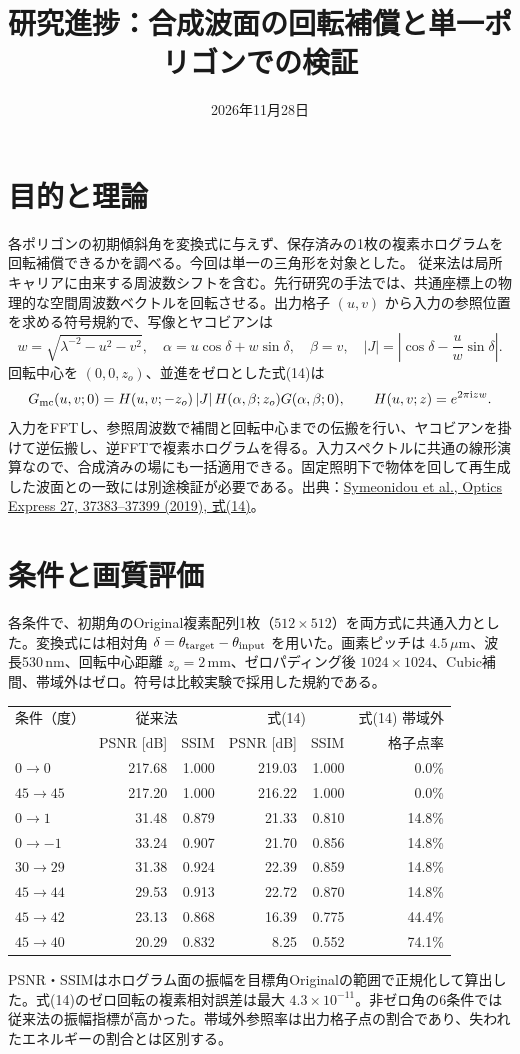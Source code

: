 \documentclass[a4paper,10pt]{ltjsarticle}
\title{研究進捗：合成波面の回転補償と単一ポリゴンでの検証}
\author{}
\date{2026年11月28日}
\begin{document}
\maketitle
\section{目的と理論}
各ポリゴンの初期傾斜角を変換式に与えず、保存済みの1枚の複素ホログラムを回転補償できるかを調べる。今回は単一の三角形を対象とした。
従来法は局所キャリアに由来する周波数シフトを含む。先行研究の手法では、共通座標上の物理的な空間周波数ベクトルを回転させる。出力格子 $(u,v)$ から入力の参照位置を求める符号規約で、写像とヤコビアンは
\[
 w=\sqrt{\lambda^{-2}-u^2-v^2},\quad
 \alpha=u\cos\delta+w\sin\delta,\quad \beta=v,\quad
 |J|=\left|\cos\delta-\frac{u}{w}\sin\delta\right|.
\]
回転中心を $(0,0,z_o)$、並進をゼロとした式(14)は
\[
 G_{\rm mc}(u,v;0)=H(u,v;-z_o)\,|J|\,
 H(\alpha,\beta;z_o)G(\alpha,\beta;0),\qquad
 H(u,v;z)=e^{2\pi\mathrm i z w}.
\]
入力をFFTし、参照周波数で補間と回転中心までの伝搬を行い、ヤコビアンを掛けて逆伝搬し、逆FFTで複素ホログラムを得る。入力スペクトルに共通の線形演算なので、合成済みの場にも一括適用できる。固定照明下で物体を回して再生成した波面との一致には別途検証が必要である。出典：\href{https://doi.org/10.1364/OE.27.037383}{Symeonidou et al., Optics Express 27, 37383--37399 (2019), 式(14)}。

\section{条件と画質評価}
各条件で、初期角のOriginal複素配列1枚（$512\times512$）を両方式に共通入力とした。変換式には相対角 $\delta=\theta_{\rm target}-\theta_{\rm input}$ を用いた。画素ピッチは $4.5\,\mu\mathrm{m}$、波長530\,nm、回転中心距離 $z_o=2$\,mm、ゼロパディング後 $1024\times1024$、Cubic補間、帯域外はゼロ。符号は比較実験で採用した規約である。

\begin{center}\small
\begin{tabular}{lrrrrr}\toprule
条件（度）&\multicolumn{2}{c}{従来法}&\multicolumn{2}{c}{式(14)}&式(14) 帯域外\\
&PSNR [dB]&SSIM&PSNR [dB]&SSIM&格子点率\\\midrule
$0\to0$&217.68&1.000&219.03&1.000&0.0\%\\
$45\to45$&217.20&1.000&216.22&1.000&0.0\%\\
$0\to1$&31.48&0.879&21.33&0.810&14.8\%\\
$0\to-1$&33.24&0.907&21.70&0.856&14.8\%\\
$30\to29$&31.38&0.924&22.39&0.859&14.8\%\\
$45\to44$&29.53&0.913&22.72&0.870&14.8\%\\
$45\to42$&23.13&0.868&16.39&0.775&44.4\%\\
$45\to40$&20.29&0.832&8.25&0.552&74.1\%\\\bottomrule
\end{tabular}
\end{center}
PSNR・SSIMはホログラム面の振幅を目標角Originalの範囲で正規化して算出した。式(14)のゼロ回転の複素相対誤差は最大 $4.3\times10^{-11}$。非ゼロ角の6条件では従来法の振幅指標が高かった。帯域外参照率は出力格子点の割合であり、失われたエネルギーの割合とは区別する。
\end{document}
